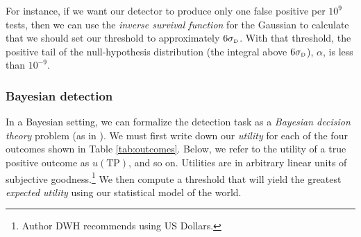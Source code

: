 \documentclass[11pt,letterpaper,linenumbers]{aastex63}
\newcommand{\sigd}{\sigma_{\mbox{\rmfamily\tiny D}}}
\newcommand{\mcc}[1]{\makebox[6em][c]{#1}}
\newcommand\tstrut{\rule[-0.5ex]{0pt}{3ex}}
\newcommand{\truepos}{\ensuremath{\mathrm{TP}}}
\newcommand{\falsepos}{\ensuremath{\mathrm{FP}}}
\newcommand{\trueneg}{\ensuremath{\mathrm{TN}}}
\newcommand{\falseneg}{\ensuremath{\mathrm{FN}}}
\begin{document}
For instance, if we want our detector to produce only one false
positive per $10^9$ tests, then we can use the \emph{inverse survival
  function} for the Gaussian to calculate that we should set our
threshold to approximately $6 \sigd$.  With that threshold, the
positive tail of the null-hypothesis distribution (the integral above
$6 \sigd$), $\alpha$, is less than $10^{-9}$.


\subsubsection{Bayesian detection}
In a Bayesian setting, we can formalize the detection task as a
\emph{Bayesian decision theory} problem (as in
\cite{astrometrydotnet}).  We must first write down our \emph{utility}
for each of the four outcomes shown in Table \ref{tab:outcomes}.
Below, we refer to the utility of a true positive outcome as
$u(\truepos)$, and so on.  Utilities are in arbitrary linear units of
subjective goodness.\footnote{Author DWH recommends using US Dollars.}
We then compute a threshold that will yield the greatest
\emph{expected utility} using our statistical model of the world.

% 
\end{document}
